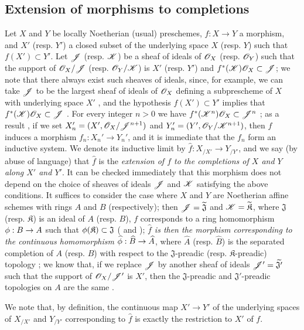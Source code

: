 \subsection{Extension of morphisms to completions}
\label{subsection:I.10.9}

\begin{env}[10.9.1]
\label{I.10.9.1}
Let $X$ and $Y$ be locally Noetherian (usual) preschemes, $f:X\to Y$ a morphism, and $X'$ (resp. $Y'$) a closed subset of the underlying space $X$ (resp. $Y$) such that $f(X')\subset Y'$.
Let $\mathscr{J}$ (resp. $\mathscr{K}$) be a sheaf of ideals of $\mathscr{O}_X$ (resp. $\mathscr{O}_Y$) such that the support of $\mathscr{O}_X/\mathscr{J}$ (resp. $\mathscr{O}_Y/\mathscr{K}$) is $X'$ (resp. $Y'$) and $f^*(\mathscr{K})\mathscr{O}_X\subset\mathscr{J}$; we note that there always exist such sheaves of ideals, since, for example, we can take $\mathscr{J}$ to be the largest sheaf of ideals of $\mathscr{O}_X$ defining a subprescheme of $X$ with underlying space $X'$ , and the hypothesis $f(X')\subset Y'$ implies that $f^*(\mathscr{K})\mathscr{O}_X\subset\mathscr{J}$ .
For every integer $n>0$ we have $f^*(\mathscr{K}^n)\mathscr{O}_X\subset\mathscr{J}^n$ ; as a result , if we set $X_n'=(X',\mathscr{O}_X/\mathscr{J}^{n+1})$ and $Y_n'=(Y',\mathscr{O}_Y/\mathscr{K}^{n+1})$, then $f$ induces a morphism $f_n:X_n'\to Y_n'$, and it is immediate that the $f_n$ form an inductive system.
We denote its inductive limit  by $\widehat{f}:X_{/X'}\to Y_{/Y'}$, and we say (by abuse of language) that $\widehat{f}$ is the \emph{extension of $f$ to the completions of $X$ and $Y$ along $X'$ and $Y'$}.
It can be checked immediately that this morphism does not depend on the choice of sheaves of ideals $\mathscr{J}$ and $\mathscr{K}$ satisfying the above conditions.
It suffices to consider the case where $X$ and $Y$ are Noetherian affine schemes with rings $A$ and $B$ (respectively); then $\mathscr{J}=\widetilde{\mathfrak{J}}$ and $\mathscr{K}=\widetilde{\mathfrak{K}}$, where $\mathfrak{J}$ (resp. $\mathfrak{K}$) is an ideal of $A$ (resp. $B$), $f$ corresponds to a ring homomorphism $\vphi:B\to A$ such that $\phi(\mathfrak{K})\subset\mathfrak{J}$ ( and ); \emph{$\widehat{f}$ is then the morphism corresponding  to the continuous homomorphism $\widehat{\vphi}:\widehat{B}\to\widehat{A}$}, where $\widehat{A}$ (resp. $\widehat{B}$) is the separated completion of $A$ (resp. $B$) with respect to the $\mathfrak{J}$-preadic (resp. $\mathfrak{K}$-preadic) topology ; we know that, if we replace $\mathscr{J}$ by another
sheaf of ideals $\mathscr{J}'=\widetilde{\mathfrak{J}'}$ such that the support of $\mathscr{O}_X/\mathscr{J}'$ is $X'$, then the $\mathfrak{J}$-preadic and $\mathfrak{J}'$-preadic topologies on $A$ are the same .

We note that, by definition, the continuous map $X'\to Y'$ of the underlying spaces of $X_{/X'}$ and $Y_{/Y'}$ corresponding to $\widehat{f}$ is exactly the restriction to $X'$ of $f$.
\end{env}

